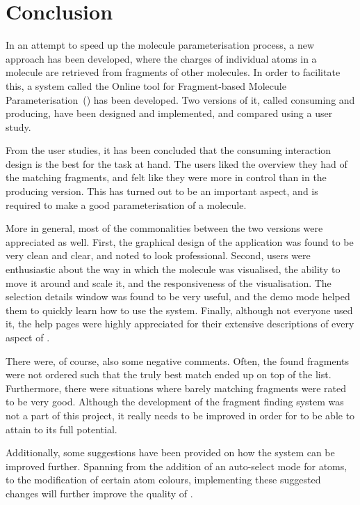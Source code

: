 \chapter{Conclusion}

%

In an attempt to speed up the molecule parameterisation process, a new approach has been developed, where the charges of individual atoms in a molecule are retrieved from fragments of other molecules. In order to facilitate this, a system called the Online tool for Fragment-based Molecule Parameterisation~(\oframp) has been developed. Two versions of it, called consuming and producing, have been designed and implemented, and compared using a user study.

From the user studies, it has been concluded that the consuming interaction design is the best for the task at hand. The users liked the overview they had of the matching fragments, and felt like they were more in control than in the producing version. This has turned out to be an important aspect, and is required to make a good parameterisation of a molecule.

More in general, most of the commonalities between the two versions were appreciated as well. First, the graphical design of the application was found to be very clean and clear, and noted to look professional. Second, users were enthusiastic about the way in which the molecule was visualised, the ability to move it around and scale it, and the responsiveness of the visualisation. The selection details window was found to be very useful, and the demo mode helped them to quickly learn how to use the system. Finally, although not everyone used it, the help pages were highly appreciated for their extensive descriptions of every aspect of \oframp.

There were, of course, also some negative comments. Often, the found fragments were not ordered such that the truly best match ended up on top of the list. Furthermore, there were situations where barely matching fragments were rated to be very good. Although the development of the fragment finding system was not a part of this project, it really needs to be improved in order for \oframp{} to be able to attain to its full potential.

Additionally, some suggestions have been provided on how the system can be improved further. Spanning from the addition of an auto-select mode for atoms, to the modification of certain atom colours, implementing these suggested changes will further improve the quality of \oframp.

